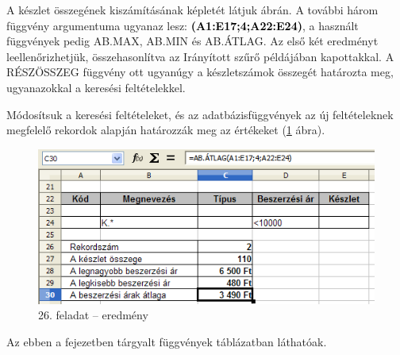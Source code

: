 A készlet összegének kiszámításának képletét látjuk
 ábrán. A további három függvény argumentuma ugyanaz
lesz: \textsf{\textbf{\textcolor{black}{(A1:E17;4;A22:E24)}}}, a
használt függvények pedig AB.MAX, AB.MIN és AB.ÁTLAG. Az első
két eredményt leellenőrizhetjük, összehasonlítva az
Irányított szűrő példájában kapottakkal. A RÉSZÖSSZEG
függvény ott ugyanúgy a készletszámok összegét
határozta meg, ugyanazokkal a keresési feltételekkel.

Módosítsuk a keresési feltételeket, és az
adatbázisfüggvények az új feltételeknek megfelelő
rekordok alapján határozzák meg az értékeket (\ref{26-feladatEredmény} ábra).

\begin{figure}[!h]
\begin{center}
\includegraphics[width=12.36cm]{oocalcv2-img121.png}
\caption{26. feladat --  eredmény}\label{26-feladatEredmény}
\end{center}
\end{figure}

Az ebben a fejezetben tárgyalt függvények 
táblázatban láthatóak.

